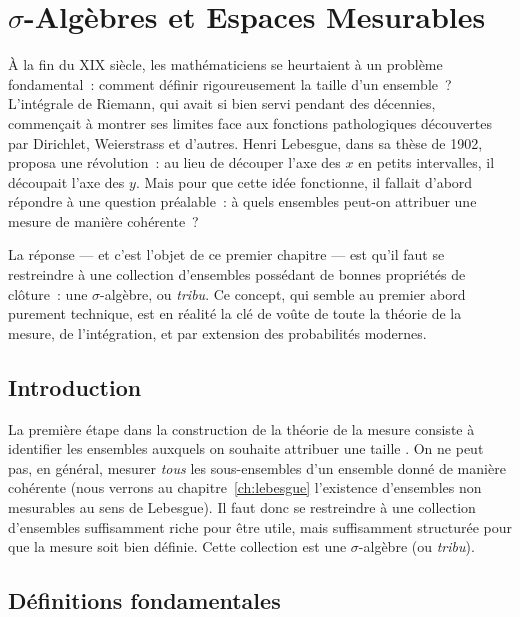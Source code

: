 \chapter{$\sigma$-Alg\`ebres et Espaces Mesurables}
\label{ch:sigma_algebres}

\`A la fin du XIX\ieme{} si\`ecle, les math\'ematiciens se heurtaient \`a un
probl\`eme fondamental~: comment d\'efinir rigoureusement la \og taille\fg{}
d'un ensemble~? L'int\'egrale de Riemann, qui avait si bien servi pendant
des d\'ecennies, commen\c{c}ait \`a montrer ses limites face aux fonctions
pathologiques d\'ecouvertes par Dirichlet, Weierstrass et d'autres. Henri
Lebesgue, dans sa th\`ese de 1902, proposa une r\'evolution~: au lieu de
d\'ecouper l'axe des $x$ en petits intervalles, il d\'ecoupait l'axe des
$y$. Mais pour que cette id\'ee fonctionne, il fallait d'abord r\'epondre
\`a une question pr\'ealable~: \`a quels ensembles peut-on attribuer une
mesure de mani\`ere coh\'erente~?

La r\'eponse --- et c'est l'objet de ce premier chapitre --- est qu'il
faut se restreindre \`a une collection d'ensembles poss\'edant de bonnes
propri\'et\'es de cl\^oture~: une $\sigma$-alg\`ebre, ou \emph{tribu}. Ce
concept, qui semble au premier abord purement technique, est en r\'ealit\'e
la cl\'e de vo\^ute de toute la th\'eorie de la mesure, de l'int\'egration, et
par extension des probabilit\'es modernes.

\section{Introduction}

La premi\`ere \'etape dans la construction de la th\'eorie de la mesure consiste \`a
identifier les ensembles auxquels on souhaite attribuer une \og taille \fg. On ne
peut pas, en g\'en\'eral, mesurer \emph{tous} les sous-ensembles d'un ensemble donn\'e
de mani\`ere coh\'erente (nous verrons au chapitre~\ref{ch:lebesgue} l'existence
d'ensembles non mesurables au sens de Lebesgue). Il faut donc se restreindre \`a une
collection d'ensembles suffisamment riche pour \^etre utile, mais suffisamment
structur\'ee pour que la mesure soit bien d\'efinie. Cette collection est une
$\sigma$-alg\`ebre (ou \emph{tribu}).

\section{D\'efinitions fondamentales}

